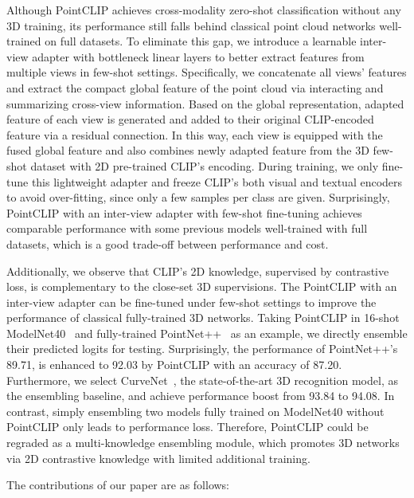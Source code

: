 \documentclass[10pt,twocolumn,letterpaper]{article}
\begin{document}
Although PointCLIP achieves cross-modality zero-shot classification without any 3D training, its performance still falls behind classical point cloud networks well-trained on full datasets. To eliminate this gap, we introduce a learnable inter-view adapter with bottleneck linear layers to better extract features from multiple views in few-shot settings. Specifically, we concatenate all views' features and extract the compact global feature of the point cloud via interacting and summarizing cross-view information. Based on the global representation, adapted feature of each view is generated and added to their original CLIP-encoded feature via a residual connection. In this way, each view is equipped with the fused global feature and also combines newly adapted feature from the 3D few-shot dataset with 2D pre-trained CLIP's encoding. During training, we only fine-tune this lightweight adapter and freeze CLIP's both visual and textual encoders to avoid over-fitting, since only a few samples per class are given. Surprisingly, PointCLIP with an inter-view adapter with few-shot fine-tuning achieves comparable performance with some previous models well-trained with full datasets, which is a good trade-off between performance and cost.

Additionally, we observe that CLIP's 2D knowledge, supervised by contrastive loss, is complementary to the close-set 3D supervisions. The PointCLIP with an inter-view adapter can be fine-tuned under few-shot settings to improve the performance of classical fully-trained 3D networks. Taking PointCLIP in 16-shot ModelNet40~\cite{wu20153d} and fully-trained PointNet++~\cite{qi2017pointnet++} as an example, we directly ensemble their predicted logits for testing. Surprisingly, the performance of PointNet++'s 89.71, is enhanced to 92.03 by PointCLIP with an accuracy of 87.20. Furthermore, we select CurveNet~\cite{muzahid2020curvenet}, the state-of-the-art 3D recognition model, as the ensembling baseline, and achieve performance boost from 93.84 to 94.08. 
In contrast, simply ensembling two models fully trained on ModelNet40 without PointCLIP only leads to performance loss. Therefore, PointCLIP could be regraded as a multi-knowledge ensembling module, which promotes 3D networks via 2D contrastive knowledge with limited additional training.

The contributions of our paper are as follows:
\end{document}
